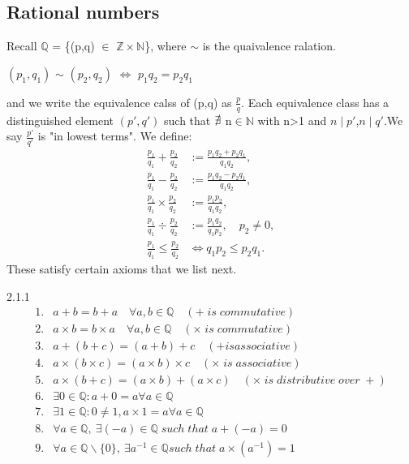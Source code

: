 \documentclass[a4paper]{article}
\def\zz{{\mathbb Z}}
\def\nn{{\mathbb N}}
\begin{document}
\subsection{Rational numbers}
Recall $ \mathbb{Q}$ = \{(p,q) $\in$ $\zz \times \nn$\}, where $\sim$ is the quaivalence ralation.\\
\begin{center}
    $(p_1,q_1)$ $\sim$ $(p_2,q_2)$ $\iff$ $p_1q_2=p_2q_1$
\end{center}
and we write the equivalence calss of (p,q) as $\frac{p}{q}$. Each equivalence class has a distinguished element $(p',q')$ such that $\slashed{\exists}$ n$\in \mathbb{N}$ with n>1 and $n \mid p'$,$n\mid q'$.We say $\frac{p'}{q'}$ is "in lowest terms". We define:\\
\begin{align*}
    \frac{p_1}{q_1}+\frac{p_2}{q_2} &:= \frac{p_1q_2+p_2q_1}{q_1q_2},\\
    \frac{p_1}{q_1}-\frac{p_2}{q_2} &:= \frac{p_1q_2-p_2q_1}{q_1q_2},\\
    \frac{p_1}{q_1} \times \frac{p_2}{q_2} &:= \frac{p_1p_2}{q_1q_2},\\
    \frac{p_1}{q_1} \div \frac{p_2}{q_2} &:= \frac{p_1q_2}{q_1p_2}, \quad p_2 \neq 0,\\
    \frac{p_1}{q_1} \leq \frac{p_2}{q_2} & \iff q_1p_2 \leq p_2q_1. 
\end{align*}
These satisfy certain axioms that we list next.
\begin{axioms}{2.1.1}{}
    \begin{align*}
        1. &a+b=b+a \quad \forall a,b \in \mathbb{Q} \quad (+ \; is \; commutative)\\
        2. &a\times b= b\times a \quad \forall a,b \in \mathbb{Q} \quad(\times  \; is\; commutative)\\ 
        3. &a+(b+c)=(a+b)+c \quad(+ is associative)\\
        4. &a\times (b\times c)= (a\times b)\times c \quad(\times\; is\; associative)\\
        5. &a\times(b+c)=(a\times b)+(a\times c) \quad(\times \;is \; distributive \;over\; +)\\
        6. &\exists 0 \in \mathbb{Q}: a+0=a \forall a \in \mathbb{Q}\\
        7. &\exists 1 \in \mathbb{Q}:0 \neq 1,a \times 1=a \forall a \in \mathbb{Q}\\
        8. &\forall a \in \mathbb{Q} ,\: \exists(-a) \in \mathbb{Q}\; such \;that\; a+(-a)=0\\
        9. &\forall a \in \mathbb{Q}\backslash \{0\},\:\exists a^{-1} \in \mathbb{Q} such\; that\; a\times (a^{-1})=1
    \end{align*}
\end{axioms}
\end{document}
